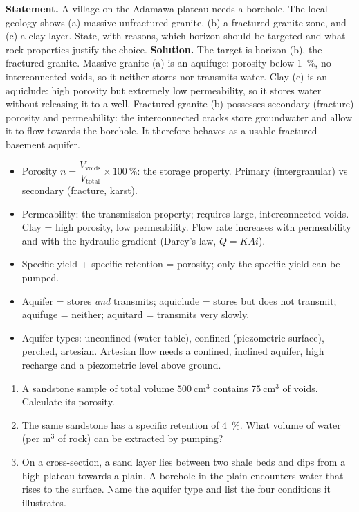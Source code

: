 \documentclass[11pt]{article}
\begin{document}
\begin{exoresolu}
\textbf{Statement.} A village on the Adamawa plateau needs a borehole. The local geology shows (a) massive unfractured granite, (b) a fractured granite zone, and (c) a clay layer. State, with reasons, which horizon should be targeted and what rock properties justify the choice.
\tcblower
\textbf{Solution.} The target is horizon (b), the fractured granite. Massive granite (a) is an aquifuge: porosity below 1\ \%, no interconnected voids, so it neither stores nor transmits water. Clay (c) is an aquiclude: high porosity but extremely low permeability, so it stores water without releasing it to a well. Fractured granite (b) possesses secondary (fracture) porosity and permeability: the interconnected cracks store groundwater and allow it to flow towards the borehole. It therefore behaves as a usable fractured basement aquifer.
\end{exoresolu}

\begin{aretenir}
\begin{itemize}
\item Porosity $n = \dfrac{V_{\text{voids}}}{V_{\text{total}}} \times 100\ \%$: the storage property. Primary (intergranular) vs secondary (fracture, karst).
\item Permeability: the transmission property; requires large, interconnected voids. Clay = high porosity, low permeability. Flow rate increases with permeability and with the hydraulic gradient (Darcy's law, $Q = K A i$).
\item Specific yield + specific retention = porosity; only the specific yield can be pumped.
\item Aquifer = stores \emph{and} transmits; aquiclude = stores but does not transmit; aquifuge = neither; aquitard = transmits very slowly.
\item Aquifer types: unconfined (water table), confined (piezometric surface), perched, artesian. Artesian flow needs a confined, inclined aquifer, high recharge and a piezometric level above ground.
\end{itemize}
\end{aretenir}

\begin{exercice}
\begin{enumerate}
\item A sandstone sample of total volume $500\ \mathrm{cm^3}$ contains $75\ \mathrm{cm^3}$ of voids. Calculate its porosity.
\item The same sandstone has a specific retention of 4\ \%. What volume of water (per $\mathrm{m^3}$ of rock) can be extracted by pumping?
\item On a cross-section, a sand layer lies between two shale beds and dips from a high plateau towards a plain. A borehole in the plain encounters water that rises to the surface. Name the aquifer type and list the four conditions it illustrates.
\end{enumerate}
\end{exercice}
\end{document}
